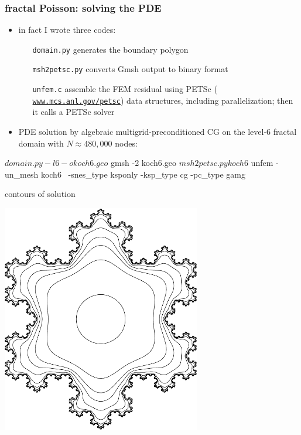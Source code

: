 \documentclass[hide notes,intlimits,usenames,dvipsnames]{beamer}
\begin{document}
\begin{frame}[fragile]
\frametitle{fractal Poisson: solving the PDE}

\setlength{\leftmarginii}{50pt}

\begin{itemize}
\item in fact I wrote three codes:
	\begin{itemize}
	\item[\texttt{domain.py}] generates the boundary polygon
	\item[\texttt{msh2petsc.py}] converts Gmsh output to binary format
	\item[\texttt{unfem.c}] assemble the FEM residual using PETSc (\href{https://www.mcs.anl.gov/petsc/}{\color{blue} \texttt{www.mcs.anl.gov/petsc}}) data structures, including parallelization; then it calls a PETSc solver
	\end{itemize}

\medskip
\item PDE solution by algebraic multigrid-preconditioned CG on the level-6 fractal domain with $N\approx 480,\!000$ nodes:
\end{itemize}

\begin{cline}
$ domain.py -l 6 -o koch6.geo
$ gmsh -2 koch6.geo
$ msh2petsc.py koch6
$ unfem -un_mesh koch6 \
    -snes_type ksponly -ksp_type cg -pc_type gamg
\end{cline}
\end{frame}


\begin{frame}{contours of solution}
\begin{center}
\includegraphics[width=0.65\textwidth]{snowflake}
\end{center}
\end{frame}
\end{document}
